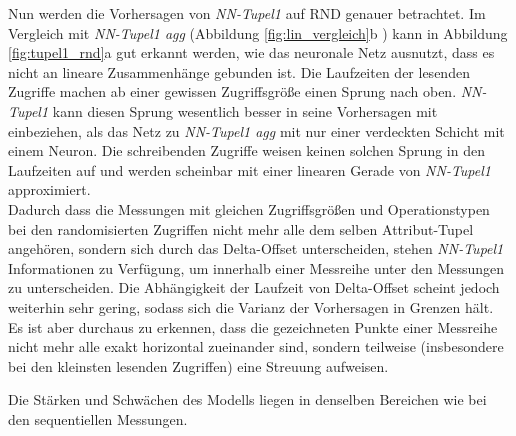 \documentclass[
	twoside,
	12pt,
	a4paper,
	BCOR10mm,
	DIV14,
	listof=totoc,
	bibliography=totoc,
	headsepline
]{scrreprt}
\begin{document}
Nun werden die Vorhersagen von \textit{NN-Tupel1} auf RND genauer betrachtet.
Im Vergleich mit \textit{NN-Tupel1 agg} (Abbildung \ref{fig:lin_vergleich}b ) kann in Abbildung \ref{fig:tupel1_rnd}a gut erkannt werden, wie das neuronale Netz ausnutzt, dass es nicht an lineare Zusammenhänge gebunden ist.
Die Laufzeiten der lesenden Zugriffe machen ab einer gewissen Zugriffsgröße einen Sprung nach oben. \textit{NN-Tupel1} kann diesen Sprung wesentlich besser in seine Vorhersagen mit einbeziehen, als das Netz zu \textit{NN-Tupel1 agg} mit nur einer verdeckten Schicht mit einem Neuron.
Die schreibenden Zugriffe weisen keinen solchen Sprung in den Laufzeiten auf und werden scheinbar mit einer linearen Gerade von \textit{NN-Tupel1} approximiert.\\
Dadurch dass die Messungen mit gleichen Zugriffsgrößen und Operationstypen bei den randomisierten Zugriffen nicht mehr alle dem selben Attribut-Tupel angehören, sondern sich durch das Delta-Offset unterscheiden, stehen \textit{NN-Tupel1} Informationen zu Verfügung, um innerhalb einer Messreihe unter den Messungen zu unterscheiden.
Die Abhängigkeit der Laufzeit von Delta-Offset scheint jedoch weiterhin sehr gering, sodass sich die Varianz der Vorhersagen in Grenzen hält.
Es ist aber durchaus zu erkennen, dass die gezeichneten Punkte einer Messreihe nicht mehr alle exakt horizontal zueinander sind, sondern teilweise (insbesondere bei den kleinsten lesenden Zugriffen) eine Streuung aufweisen.\medskip

Die Stärken und Schwächen des Modells liegen
in denselben Bereichen wie bei den sequentiellen Messungen.
\end{document}
